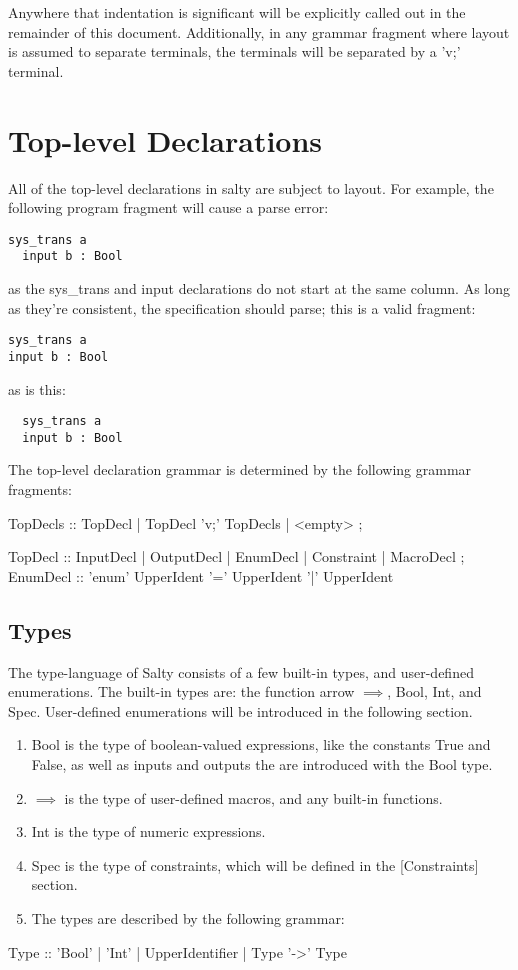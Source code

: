 Anywhere that indentation is significant will be explicitly called out in the 
remainder of this document. Additionally, in any grammar fragment where layout is 
assumed to separate terminals, the terminals will be separated by a 'v;' terminal.

\section{Top-level Declarations}

All of the top-level declarations in salty are subject to layout. For example, 
the following program fragment will cause a parse error:
\begin{lstlisting}
sys_trans a
  input b : Bool
\end{lstlisting}
\noindent as the sys\_trans and input declarations do not start at the same column. 
As long as they're consistent, the specification should parse; this is a valid fragment:
\begin{lstlisting}
sys_trans a
input b : Bool
\end{lstlisting}
\noindent as is this:
\begin{lstlisting}
  sys_trans a
  input b : Bool
\end{lstlisting}
\noindent The top-level declaration grammar is determined by the following grammar 
fragments:
\begin{Grammar}
  TopDecls :: TopDecl | TopDecl 'v;' TopDecls | <empty> ;

  TopDecl :: InputDecl | OutputDecl | EnumDecl
        | Constraint | MacroDecl ;
  EnumDecl :: 'enum' UpperIdent '=' UpperIdent { '|' UpperIdent }
\end{Grammar}

\newpage

\subsection{Types}

The type-language of Salty consists of a few built-in types, and user-defined 
enumerations. The built-in types are: the function arrow $\implies$, Bool, Int, 
and Spec. User-defined enumerations will be introduced in the following section.
\begin{enumerate}
  \item Bool is the type of boolean-valued expressions, like the constants True 
  and False, as well as inputs and outputs the are introduced with the Bool type.
  \item $\implies$ is the type of user-defined macros, and any built-in functions.
  \item Int is the type of numeric expressions.
  \item Spec is the type of constraints, which will be defined in the [Constraints] 
  section.
  \item The types are described by the following grammar:
\end{enumerate}
\begin{Grammar}
  Type :: 'Bool' | 'Int' | UpperIdentifier | Type '->' Type
\end{Grammar}

